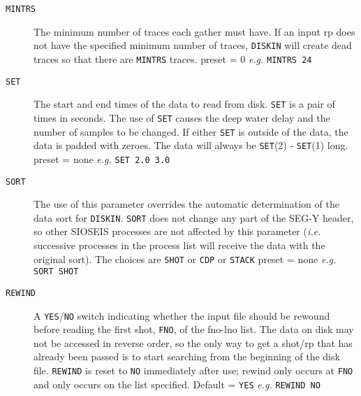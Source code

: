 \begin{description}
\item[\texttt{MINTRS}] The minimum number of traces each gather must have.  If
         an input \gls{rp} does not have the specified minimum number of
         traces, \texttt{DISKIN} will create dead traces so that there are
         \texttt{MINTRS} traces.
         \Gls{preset} = 0     \textit{e.g.}  \texttt{MINTRS 24}

\item[\texttt{SET}]    The start and end times of the data to read from disk.
         \texttt{SET} is a pair of times in seconds. The use of \texttt{SET} causes
         the deep water delay and the number of samples to be
         changed.  If either \texttt{SET} is outside of the data, the data
         is padded with zeroes.  The data will always be
         \texttt{SET}(2) - \texttt{SET}(1) long.
         \Gls{preset} = none  \textit{e.g.}   \texttt{SET 2.0 3.0}

\item[\texttt{SORT}]   The use of this parameter overrides the automatic
         determination of the data sort for \texttt{DISKIN}.  \texttt{SORT} does not
         change any part of the SEG-Y header, so other SIOSEIS
         processes are not affected by this parameter (\textit{i.e.}
         successive processes in the process list will receive the
         data with the original sort).   The choices are \texttt{SHOT} or \texttt{CDP} or \texttt{STACK}
         \Gls{preset} = none  \textit{e.g.}  \texttt{SORT SHOT}

\item[\texttt{REWIND}] A \texttt{YES}/\texttt{NO} switch indicating whether the input file should be
         rewound before reading the first \gls{shot}, \texttt{FNO}, of the fno-lno
         list.  The data on disk may not be accessed in reverse order,
         so the only way to get a \gls{shot}/\gls{rp} that has already been passed
         is to start searching from the beginning of the disk file.
         \texttt{REWIND} is reset to \texttt{NO} immediately after use; rewind only
         occurs at \texttt{FNO} and only occurs on the list specified.
         Default = \texttt{YES}    \textit{e.g.}   \texttt{REWIND NO}


\end{description}
